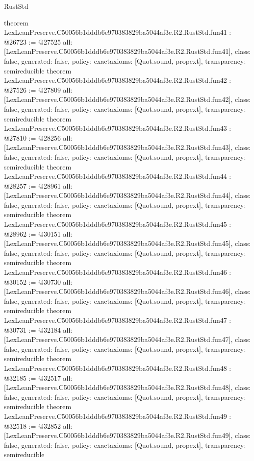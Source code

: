 \begin{lexlean}{RustStd}
\begin{coremodule}
{}
theorem LexLeanPreserve.C50056b1dddb6e970383829ba5044af3e.R2.RustStd.fun41 : @26723 := @27525 {
  all: [LexLeanPreserve.C50056b1dddb6e970383829ba5044af3e.R2.RustStd.fun41],
  class: false,
  generated: false,
  policy: exact{axioms: [Quot.sound, propext]},
  transparency: semireducible
}
theorem LexLeanPreserve.C50056b1dddb6e970383829ba5044af3e.R2.RustStd.fun42 : @27526 := @27809 {
  all: [LexLeanPreserve.C50056b1dddb6e970383829ba5044af3e.R2.RustStd.fun42],
  class: false,
  generated: false,
  policy: exact{axioms: [Quot.sound, propext]},
  transparency: semireducible
}
theorem LexLeanPreserve.C50056b1dddb6e970383829ba5044af3e.R2.RustStd.fun43 : @27810 := @28256 {
  all: [LexLeanPreserve.C50056b1dddb6e970383829ba5044af3e.R2.RustStd.fun43],
  class: false,
  generated: false,
  policy: exact{axioms: [Quot.sound, propext]},
  transparency: semireducible
}
theorem LexLeanPreserve.C50056b1dddb6e970383829ba5044af3e.R2.RustStd.fun44 : @28257 := @28961 {
  all: [LexLeanPreserve.C50056b1dddb6e970383829ba5044af3e.R2.RustStd.fun44],
  class: false,
  generated: false,
  policy: exact{axioms: [Quot.sound, propext]},
  transparency: semireducible
}
theorem LexLeanPreserve.C50056b1dddb6e970383829ba5044af3e.R2.RustStd.fun45 : @28962 := @30151 {
  all: [LexLeanPreserve.C50056b1dddb6e970383829ba5044af3e.R2.RustStd.fun45],
  class: false,
  generated: false,
  policy: exact{axioms: [Quot.sound, propext]},
  transparency: semireducible
}
theorem LexLeanPreserve.C50056b1dddb6e970383829ba5044af3e.R2.RustStd.fun46 : @30152 := @30730 {
  all: [LexLeanPreserve.C50056b1dddb6e970383829ba5044af3e.R2.RustStd.fun46],
  class: false,
  generated: false,
  policy: exact{axioms: [Quot.sound, propext]},
  transparency: semireducible
}
theorem LexLeanPreserve.C50056b1dddb6e970383829ba5044af3e.R2.RustStd.fun47 : @30731 := @32184 {
  all: [LexLeanPreserve.C50056b1dddb6e970383829ba5044af3e.R2.RustStd.fun47],
  class: false,
  generated: false,
  policy: exact{axioms: [Quot.sound, propext]},
  transparency: semireducible
}
theorem LexLeanPreserve.C50056b1dddb6e970383829ba5044af3e.R2.RustStd.fun48 : @32185 := @32517 {
  all: [LexLeanPreserve.C50056b1dddb6e970383829ba5044af3e.R2.RustStd.fun48],
  class: false,
  generated: false,
  policy: exact{axioms: [Quot.sound, propext]},
  transparency: semireducible
}
theorem LexLeanPreserve.C50056b1dddb6e970383829ba5044af3e.R2.RustStd.fun49 : @32518 := @32852 {
  all: [LexLeanPreserve.C50056b1dddb6e970383829ba5044af3e.R2.RustStd.fun49],
  class: false,
  generated: false,
  policy: exact{axioms: [Quot.sound, propext]},
  transparency: semireducible
}
\end{coremodule}
\end{lexlean}
